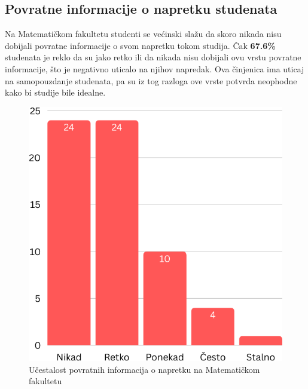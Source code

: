 \documentclass[a4paper]{article}
\begin{document}
{\subsection{Povratne informacije o napretku studenata}
\label{subsec:napredak_iskustva}
Na Matematičkom fakultetu studenti se većinski slažu da skoro nikada nisu dobijali povratne informacije o svom napretku tokom studija. Čak \textbf{67.6\%} studenata je reklo da su jako retko ili da nikada nisu dobijali ovu vrstu povratne informacije, što je negativno uticalo na njihov napredak. Ova činjenica ima uticaj na samopouzdanje studenata, pa su iz tog razloga ove vrste potvrda neophodne kako bi studije bile idealne. 
\begin{figure}[h!]
\begin{center}
    \includegraphics[scale = 0.3]{PovratneInformacijeMatf.png}
    \caption{Učestalost povratnih informacija o napretku na Matematičkom fakultetu}
    \label{fig:povratne_informacije_matf}
\end{center}
\end{figure}

}
\end{document}
